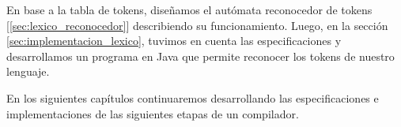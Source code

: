 En base a la tabla de tokens, diseñamos el autómata reconocedor de tokens [\ref{sec:lexico_reconocedor}] describiendo su funcionamiento. Luego, en la sección \ref{sec:implementacion_lexico}, tuvimos en cuenta las especificaciones y desarrollamos un programa en Java que permite reconocer los tokens de nuestro lenguaje.

En los siguientes capítulos continuaremos desarrollando las especificaciones e implementaciones de las siguientes etapas de un compilador.